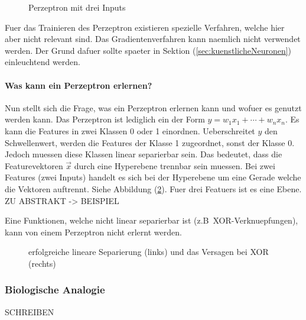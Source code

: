 \documentclass[../main]{subfiles}
\begin{document}
\begin{figure}[h!]
  \centering
  \caption{Perzeptron mit drei Inputs}
  \label{fi:perzeptron}
\end{figure}

Fuer das Trainieren des Perzeptron existieren spezielle Verfahren, welche hier
aber nicht relevant sind. Das Gradientenverfahren kann naemlich nicht verwendet
werden. Der Grund dafuer sollte spaeter in Sektion (\ref{sec:kuenstlicheNeuronen}) einleuchtend werden.

\paragraph{Was kann ein Perzeptron erlernen?}
Nun stellt sich die Frage, was ein Perzeptron erlernen kann und wofuer es genutzt werden kann.
Das Perzeptron ist lediglich ein  der Form
$y = w_1x_1 + \cdots + w_n x_n$.
Es kann die Features in zwei Klassen 0 oder 1 einordnen.
Ueberschreitet $y$ den Schwellenwert, werden die Features der Klasse 1 zugeordnet, sonst
der Klasse 0.
Jedoch muessen diese Klassen linear separierbar sein.
Das bedeutet, dass die Featurevektoren $\vec{x}$ durch eine Hyperebene trennbar
sein muessen.
Bei zwei Features (zwei Inputs) handelt es sich bei der Hyperebene um eine
Gerade welche die Vektoren auftrennt. Siehe Abbildung (\ref{fig:linearer_Klassifikator}).
Fuer drei Featuers ist es eine Ebene.
ZU ABSTRAKT -> BEISPIEL

Eine Funktionen, welche nicht linear separierbar ist (z.B\ XOR-Verknuepfungen),
kann von einem Perzeptron nicht erlernt werden.

\begin{figure}[h!]

  \caption{erfolgreiche lineare Separierung (links) und das Versagen bei XOR (rechts)}
  \label{fig:linearer_Klassifikator}
\end{figure}

\cite{wiki:perzeptron}

\subsubsection{Biologische Analogie}
SCHREIBEN
\end{document}
